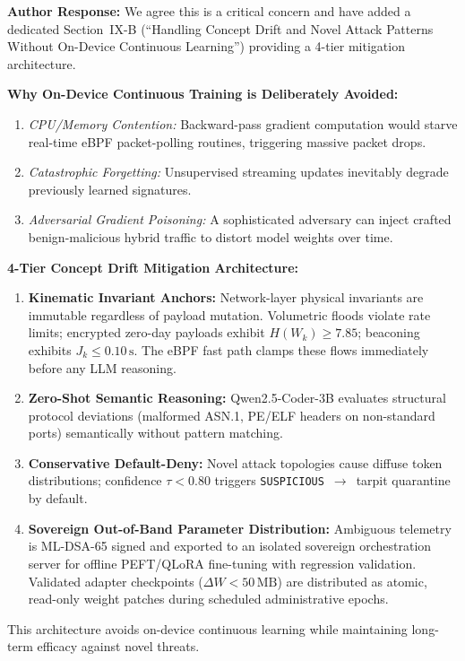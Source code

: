\documentclass[10pt,letterpaper]{article}
\begin{document}
\begin{authorbox}
\textbf{Author Response:}
We agree this is a critical concern and have added a dedicated Section~IX-B
(``Handling Concept Drift and Novel Attack Patterns Without On-Device
Continuous Learning'') providing a 4-tier mitigation architecture.

\textbf{Why On-Device Continuous Training is Deliberately Avoided:}
\begin{enumerate}
  \item \textit{CPU/Memory Contention:} Backward-pass gradient computation
    would starve real-time eBPF packet-polling routines, triggering massive
    packet drops.
  \item \textit{Catastrophic Forgetting:} Unsupervised streaming updates
    inevitably degrade previously learned signatures.
  \item \textit{Adversarial Gradient Poisoning:} A sophisticated adversary
    can inject crafted benign-malicious hybrid traffic to distort model weights
    over time.
\end{enumerate}

\textbf{4-Tier Concept Drift Mitigation Architecture:}
\begin{enumerate}
  \item \textbf{Kinematic Invariant Anchors:} Network-layer physical invariants
    are immutable regardless of payload mutation. Volumetric floods violate rate
    limits; encrypted zero-day payloads exhibit $H(W_k) \ge 7.85$; beaconing
    exhibits $J_k \le 0.10\,\mathrm{s}$. The eBPF fast path clamps these
    flows immediately before any LLM reasoning.
  \item \textbf{Zero-Shot Semantic Reasoning:} Qwen2.5-Coder-3B evaluates
    structural protocol deviations (malformed ASN.1, PE/ELF headers on
    non-standard ports) semantically without pattern matching.
  \item \textbf{Conservative Default-Deny:} Novel attack topologies cause
    diffuse token distributions; confidence $\tau < 0.80$ triggers
    \texttt{SUSPICIOUS}~$\to$~tarpit quarantine by default.
  \item \textbf{Sovereign Out-of-Band Parameter Distribution:} Ambiguous
    telemetry is ML-DSA-65 signed and exported to an isolated sovereign
    orchestration server for offline PEFT/QLoRA fine-tuning with regression
    validation. Validated adapter checkpoints ($\Delta W < 50\,\mathrm{MB}$)
    are distributed as atomic, read-only weight patches during scheduled
    administrative epochs.
\end{enumerate}

This architecture avoids on-device continuous learning while maintaining
long-term efficacy against novel threats.
\end{authorbox}
\end{document}
